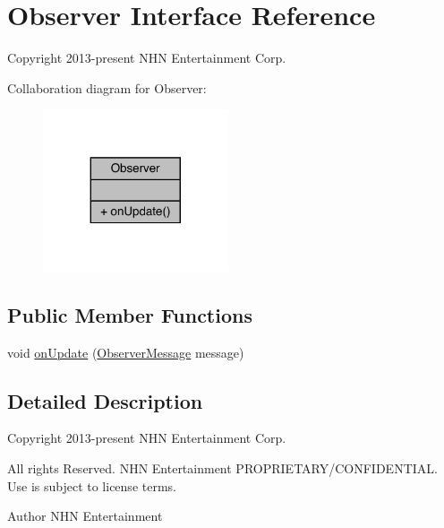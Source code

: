 \hypertarget{interfacecom_1_1toast_1_1android_1_1gamebase_1_1observer_1_1_observer}{}\section{Observer Interface Reference}
\label{interfacecom_1_1toast_1_1android_1_1gamebase_1_1observer_1_1_observer}


Copyright 2013-\/present N\+HN Entertainment Corp.  




Collaboration diagram for Observer\+:\nopagebreak
\begin{figure}[H]
\begin{center}
\leavevmode
\includegraphics[width=155pt]{interfacecom_1_1toast_1_1android_1_1gamebase_1_1observer_1_1_observer__coll__graph}
\end{center}
\end{figure}
\subsection*{Public Member Functions}
\begin{DoxyCompactItemize}
\item 
void \hyperlink{interfacecom_1_1toast_1_1android_1_1gamebase_1_1observer_1_1_observer_af378cfb05f1463948df9ed0c682ac910}{on\+Update} (\hyperlink{classcom_1_1toast_1_1android_1_1gamebase_1_1observer_1_1_observer_message}{Observer\+Message} message)
\end{DoxyCompactItemize}


\subsection{Detailed Description}
Copyright 2013-\/present N\+HN Entertainment Corp. 

All rights Reserved. N\+HN Entertainment P\+R\+O\+P\+R\+I\+E\+T\+A\+R\+Y/\+C\+O\+N\+F\+I\+D\+E\+N\+T\+I\+AL. Use is subject to license terms.

\begin{DoxyAuthor}{Author}
N\+HN Entertainment 
\end{DoxyAuthor}


